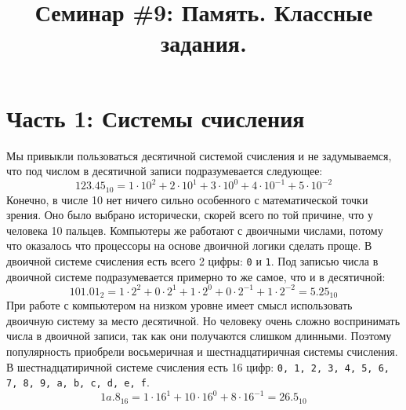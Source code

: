 \documentclass{article}
\begin{document}
\newpage

\title{Семинар \#9: Память. Классные задания.\vspace{-5ex}}\date{}\maketitle
\section*{Часть 1: Системы счисления}
Мы привыкли пользоваться десятичной системой счисления и не задумываемся, что под числом в десятичной записи подразумевается следующее:
$$
123.45_{10} = 1 \cdot 10^2 + 2 \cdot 10^1 + 3 \cdot 10^0 + 4 \cdot 10^{-1} + 5 \cdot 10^{-2}
$$
Конечно, в числе 10 нет ничего сильно особенного с математической точки зрения. Оно было выбрано исторически, скорей всего по той причине, что у человека 10 пальцев. Компьютеры же работают с двоичными числами, потому что оказалось что процессоры на основе двоичной логики сделать проще. В двоичной системе счисления есть всего 2 цифры: \texttt{0} и \texttt{1}. Под записью числа в двоичной системе подразумевается примерно то же самое, что и в десятичной:
$$
101.01_2 = 1 \cdot 2^2 + 0 \cdot 2^1 + 1 \cdot 2^0 + 0 \cdot 2^{-1} + 1 \cdot 2^{-2} = 5.25_{10}
$$
При работе с компьютером на низком уровне имеет смысл использовать двоичную систему за место десятичной.  Но человеку очень сложно воспринимать числа в двоичной записи, так как они получаются слишком длинными. Поэтому популярность приобрели восьмеричная и шестнадцатиричная системы счисления. В шестнадцатиричной системе счисления есть 16 цифр: \texttt{0, 1, 2, 3, 4, 5, 6, 7, 8, 9, a, b, c, d, e, f}.
$$
1a.8_{16} = 1 \cdot 16^1 + 10 \cdot 16^0 + 8 \cdot 16^{-1} = 26.5_{10}
$$
\end{document}
